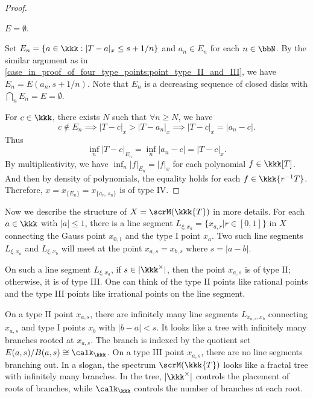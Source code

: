 \begin{proof}
        \begin{case}\label{case_in_proof_of_four_type_points:point_type_IV}
            \(E = \emptyset\).
        \end{case}

        Set \(E_n = \{a \in \kkk : |T - a|_x \leq s + 1/n\}\) and \(a_n \in E_n\) for each \(n \in \bbN\).
        By the similar argument as in \cref{case_in_proof_of_four_type_points:point_type_II_and_III}, we have \(E_n = E(a_n, s + 1/n)\).
        Note that \(E_n\) is a decreasing sequence of closed disks with \(\bigcap_n E_n = E = \emptyset\).
        
        For \(c \in \kkk\), there exists \(N\) such that \(\forall n \geq N\), we have
        \[ c \notin E_n \implies |T - c|_x > |T - a_n|_x \implies |T - c|_x = |a_n - c|. \]
        Thus
        \[ \inf_n |T-c|_{E_n} = \inf_n |a_n - c| = |T - c|_x. \]
        By multiplicativity, we have \(\inf_n |f|_{E_n} = |f|_x\) for each polynomial \(f \in \kkk[T]\).
        And then by density of polynomials, the equality holds for each \(f \in \kkk\{r^{-1}T\}\).
        Therefore, \(x = x_{\{E_n\}} = x_{\{a_n,s_n\}}\) is of type IV.
    \end{proof}

    Now we describe the structure of \(X = \scrM(\kkk\{T\})\) in more details.
    For each \(a \in \kkk\) with \(|a| \leq 1\), there is a line segment \(L_{\xi,x_a}=\{x_{a,r}| r \in [0,1]\}\) in \(X\) connecting the Gauss point \(x_{0,1}\) and the type I point \(x_a\).
    Two such line segments \(L_{\xi,x_a}\) and \(L_{\xi,x_b}\) will meet at the point \(x_{a,s}=x_{b,s}\) where \(s = |a - b|\).
    
    On such a line segment \(L_{\xi,x_a}\), if \(s \in |\kkk^\times|\), then the point \(x_{a,s}\) is of type II; otherwise, it is of type III.
    One can think of the type II points like rational points and the type III points like irrational points on the line segment.
    
    On a type II point \(x_{a,s}\), there are infinitely many line segments \(L_{x_{a,s},x_b}\) connecting \(x_{a,s}\) and type I points \(x_b\) with \(|b - a| < s\).
    It looks like a tree with infinitely many branches rooted at \(x_{a,s}\).
    The branch is indexed by the quotient set \(E(a,s)/B(a,s) \cong \calk_\kkk\).
    On a type III point \(x_{a,s}\), there are no line segments branching out.
    In a slogan, the spectrum \(\scrM(\kkk\{T\})\) looks like a fractal tree with infinitely many branches.
    In the tree, \(|\kkk^\times|\) controls the placement of roots of branches, while \(\calk_\kkk\) controls the number of branches at each root.

